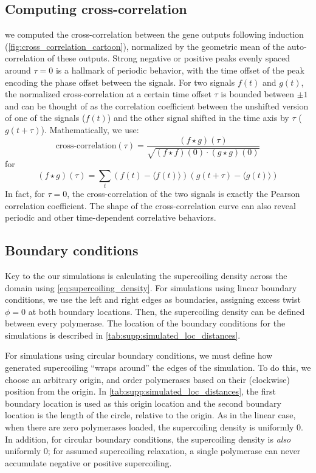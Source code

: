 \documentclass[11pt]{article}
\begin{document}
\subsection{Computing cross-correlation} \label{sec:supp:cross_correlation}
we computed the cross-correlation between the gene outputs following induction (\cref{fig:cross_correlation_cartoon}), normalized by the geometric mean of the auto-correlation of these outputs.  Strong negative or positive peaks evenly spaced around \(\tau = 0\) is a hallmark of periodic behavior, with the time offset of the peak encoding the phase offset between the signals. For two signals \(f(t)\) and \(g(t)\), the normalized cross-correlation at a certain time offset \(\tau\) is bounded between \(\pm1\) and can be thought of as the correlation coefficient between the unshifted version of one of the signals (\(f(t)\)) and the other signal shifted in the time axis by \(\tau\) (\(g(t + \tau)\)). Mathematically, we use:
\begin{equation}
\text{cross-correlation}(\tau) = \frac{(f \star g)(\tau)}{\sqrt{(f \star f)(0) \cdot (g \star g)(0)}}
\end{equation}
for
\begin{equation}
    (f \star g)(\tau) = \sum_t (f(t) - \langle f(t)\rangle)(g(t+\tau) - \langle g(t)\rangle)
\end{equation}
In fact, for \(\tau = 0\), the cross-correlation of the two signals is exactly the Pearson correlation coefficient. The shape of the cross-correlation curve can also reveal periodic and other time-dependent correlative behaviors.

\subsection{Boundary conditions} \label{sec:appendix:bcs}

Key to the our simulations is calculating the supercoiling density across the domain using \cref{eq:supercoiling_density}.
For simulations using linear boundary conditions, we use the left and right edges as boundaries, assigning excess twist \(\phi = 0\) at both boundary locations. Then, the supercoiling density can be defined between every polymerase. The location of the boundary conditions for the simulations is described in \cref{tab:supp:simulated_loc_distances}.

For simulations using circular boundary conditions, we must define how generated supercoiling ``wraps around'' the edges of the simulation. To do this, we choose an arbitrary origin, and order polymerases based on their (clockwise) position from the origin. In \cref{tab:supp:simulated_loc_distances}, the first boundary location is used as this origin location and the second boundary location is the length of the circle, relative to the origin. As in the linear case, when there are zero polymerases loaded, the supercoiling density is uniformly 0. In addition, for circular boundary conditions, the supercoiling density is \emph{also} uniformly 0; for assumed supercoiling relaxation, a single polymerase can never accumulate negative or positive supercoiling.
\end{document}
